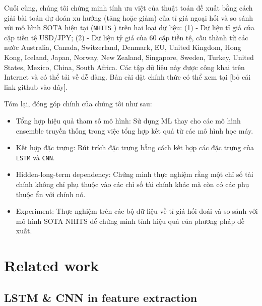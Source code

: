 \documentclass[aps,prb,groupedaddress,twocolumn,showpacs,dvipdfmx, superscriptaddress,pdftex]{revtex4-2}
\begin{document}
\vspace{2mm}

Cuối cùng, chúng tôi chứng minh tính ưu việt của thuật toán đề xuất bằng cách giải bài toán dự đoán xu hướng (tăng hoặc giảm) của tỉ giá ngoại hối và so sánh với mô hình SOTA hiện tại (\verb|NHITS| \cite{challu2023nhits}) trên hai loại dữ liệu: (1) - Dữ liệu tỉ giả của cặp tiền tệ USD/JPY; (2) - Dữ liệu tỷ giá của 60 cặp tiền tệ, cấu thành từ các nước Australia, Canada, Switzerland, Denmark, EU, United Kingdom, Hong Kong, Iceland, Japan, Norway, New Zealand, Singapore, Sweden, Turkey, United States, Mexico, China, South Africa. Các tập dữ liệu này được công khai trên Internet và có thể tải về dễ dàng. Bản cài đặt chính thức có thể xem tại [bỏ cái link github vào đây].

\vspace{2mm}

Tóm lại, đóng góp chính của chúng tôi như sau:

\begin{itemize}
  \item Tổng hợp hiệu quả tham số mô hình: Sử dụng ML thay cho các mô hình ensemble truyền thống trong việc tổng hợp kết quả từ các mô hình học máy.
  \item Kết hợp đặc trưng: Rút trích đặc trưng bằng cách kết hợp các đặc trưng của \verb|LSTM| và \verb|CNN|.
  \item Hidden-long-term dependency: Chứng minh thực nghiệm rằng một chỉ số tài chính không chỉ phụ thuộc vào các chỉ số tài chính khác mà còn có các phụ thuộc ẩn với chính nó.
  \item Experiment: Thực nghiệm trên các bộ dữ liệu về tỉ giá hối đoái và so sánh với mô hình SOTA NHITS để chứng minh tính hiệu quả của phương pháp đề xuất.
\end{itemize}

\section{Related work}
\label{sec.relatedWork}

\subsection{LSTM \& CNN in feature extraction}
\end{document}
